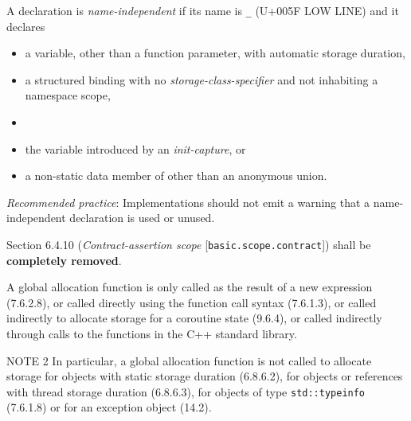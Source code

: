 \begin{modification}
A declaration is \emph{name-independent} if its name is \texttt{\_} (U+005F LOW
LINE) and it declares

\begin{itemize}[label=\textemdash]

\item
a variable, other than a function parameter, with automatic storage duration,

\item
a structured binding with no \emph{storage-class-specifier} and not inhabiting a namespace scope,

\item
{}

\item
the variable introduced by an \emph{init-capture}, or

\item
a non-static data member of other than an anonymous union.

\end{itemize}

\emph{Recommended practice}: Implementations should not emit a warning that a name-independent declaration is
used or unused.
\end{modification}

\begin{removal}
\end{removal}

\begin{removal}
Section 6.4.10 (\emph{Contract-assertion scope} [\texttt{basic.scope.contract}])
shall be \textbf{completely removed}.
\end{removal}

\begin{modification}
A global allocation function is only called as the result of a new expression (7.6.2.8), or called directly using
the function call syntax (7.6.1.3), or called indirectly to allocate storage for a coroutine state (9.6.4), or called
indirectly through calls to the functions in the C++ standard library.
\newline

NOTE 2 In particular, a global allocation function is not called to allocate storage for objects with static storage
duration (6.8.6.2), for objects or references with thread storage duration
(6.8.6.3), for objects of type \texttt{std::typeinfo} (7.6.1.8)
or for an exception object (14.2).
\end{modification}

